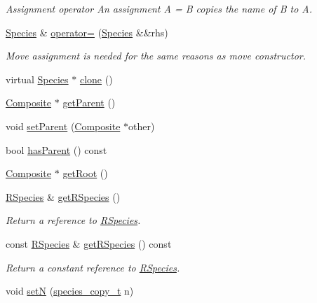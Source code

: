 \begin{DoxyCompactItemize}
\begin{DoxyCompactList}\small\item\em Assignment operator An assignment A = B copies the name of B to A. \end{DoxyCompactList}\item 
\hyperlink{classchem_1_1Species}{Species} \& \hyperlink{classchem_1_1Species_ae9344aa4bcd5fb1a511361bef72162f6}{operator=} (\hyperlink{classchem_1_1Species}{Species} \&\&rhs)
\begin{DoxyCompactList}\small\item\em Move assignment is needed for the same reasons as move constructor. \end{DoxyCompactList}\item 
virtual \hyperlink{classchem_1_1Species}{Species} $\ast$ \hyperlink{classchem_1_1Species_acf0054a3704627698ba91293e8d0d370}{clone} ()
\item 
\hyperlink{classchem_1_1Composite}{Composite} $\ast$ \hyperlink{classchem_1_1Species_acdc83314b339310022d56e024f124a34}{get\-Parent} ()
\item 
void \hyperlink{classchem_1_1Species_a50e1e828d0b8a03efc9354e2c00174f5}{set\-Parent} (\hyperlink{classchem_1_1Composite}{Composite} $\ast$other)
\item 
bool \hyperlink{classchem_1_1Species_a6ddddc5be2b0e4427486f80a891879b3}{has\-Parent} () const 
\item 
\hyperlink{classchem_1_1Composite}{Composite} $\ast$ \hyperlink{classchem_1_1Species_aa5931e2aae4856c1b438691c23ada5aa}{get\-Root} ()
\item 
\hyperlink{classchem_1_1RSpecies}{R\-Species} \& \hyperlink{classchem_1_1Species_a1719a8155a69e9a62593d23d4bfc8514}{get\-R\-Species} ()
\begin{DoxyCompactList}\small\item\em Return a reference to \hyperlink{classchem_1_1RSpecies}{R\-Species}. \end{DoxyCompactList}\item 
const \hyperlink{classchem_1_1RSpecies}{R\-Species} \& \hyperlink{classchem_1_1Species_a438dae186317809effdd040ed38c568b}{get\-R\-Species} () const 
\begin{DoxyCompactList}\small\item\em Return a constant reference to \hyperlink{classchem_1_1RSpecies}{R\-Species}. \end{DoxyCompactList}\item 
void \hyperlink{classchem_1_1Species_af10a33a212fdb986fb93613e9c219f7a}{set\-N} (\hyperlink{common_8h_a3503f321fd36304ee274141275cca586}{species\-\_\-copy\-\_\-t} n)

\end{DoxyCompactItemize}
